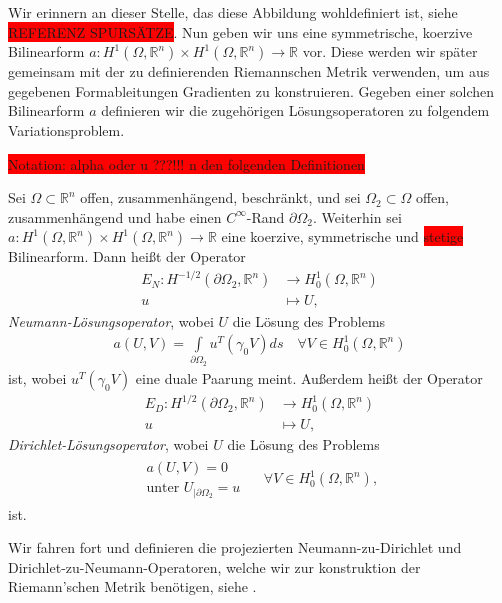 Wir erinnern an dieser Stelle, das diese Abbildung wohldefiniert ist, siehe \colorbox{red}{REFERENZ SPURSÄTZE}. Nun geben wir uns eine symmetrische, koerzive Bilinearform $a: H^1(\Omega, \mathbb{R}^n)\times H^1(\Omega, \mathbb{R}^n) \rightarrow \mathbb{R}$ vor. Diese werden wir später gemeinsam mit der zu definierenden Riemannschen Metrik verwenden, um aus gegebenen Formableitungen Gradienten zu konstruieren. Gegeben einer solchen Bilinearform $a$ definieren wir die zugehörigen Lösungsoperatoren zu folgendem Variationsproblem.

\colorbox{red}{Notation: alpha oder u ???!!! n den folgenden Definitionen}

\begin{defi}[Lösungsoperatoren]\label{Llsgsoperatoren}
Sei $\Omega\subset\mathbb{R}^n$ offen, zusammenhängend, beschränkt, und sei $\Omega_2\subset \Omega$ offen, zusammenhängend und habe einen $C^\infty$-Rand $\partial\Omega_2$.
Weiterhin sei $a: H^1(\Omega, \mathbb{R}^n)\times H^1(\Omega, \mathbb{R}^n) \rightarrow \mathbb{R}$ eine koerzive, symmetrische und \colorbox{red}{stetige}  Bilinearform. Dann heißt der Operator 
\begin{align*}
	E_N: H^{-1/2}(\partial\Omega_2, \mathbb{R}^n) &\rightarrow H^{1}_0(\Omega, \mathbb{R}^n) \\
	u &\mapsto U,
\end{align*}
\textit{Neumann-Lösungsoperator}, wobei $U$ die Lösung des Problems
\begin{align*}
	a(U,V) = \underset{\partial\Omega_2}{\int}u^T(\gamma_0 V)ds \quad \forall V \in H^1_0(\Omega,\mathbb{R}^n)
\end{align*}
ist, wobei $u^T(\gamma_0 V)$ eine duale Paarung meint. Außerdem heißt der Operator
\begin{align*}
	E_D: H^{1/2}(\partial\Omega_2, \mathbb{R}^n) &\rightarrow H^{1}_0(\Omega, \mathbb{R}^n) \\
	u &\mapsto U,
\end{align*}
\textit{Dirichlet-Lösungsoperator}, wobei $U$ die Lösung des Problems
\begin{align*}
	\begin{matrix} a(U,V) = 0 \\
	\text{unter } U_{\vert \partial\Omega_2} = u 
	\end{matrix} \quad\; \forall V \in H^1_0(\Omega,\mathbb{R}^n),
\end{align*}
ist.
\end{defi}

Wir fahren fort und definieren die projezierten Neumann-zu-Dirichlet und Dirichlet-zu-Neumann-Operatoren, welche wir zur konstruktion der Riemann'schen Metrik benötigen, siehe \cite{bfgs1}.

